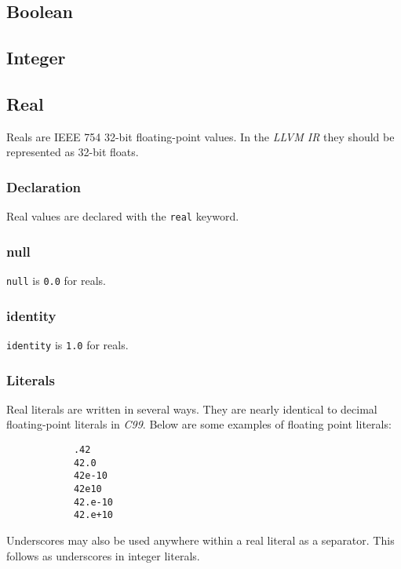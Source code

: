 \documentclass[../../gazprea.tex]{subfiles}
\begin{document}
\subsection{Boolean}
\label{ssec:boolean}


\subsection{Integer}
\label{ssec:integer}


	\subsection{Real}\label{sec:real}

		Reals are IEEE 754 32-bit floating-point values. In the \textit{LLVM IR} they should be represented as 32-bit
		floats.

	\subsubsection{Declaration}

		Real values are declared with the \texttt{real} keyword.

	\subsubsection{null}

		\texttt{null} is \texttt{0.0} for reals.

	\subsubsection{identity}

		\texttt{identity} is \texttt{1.0} for reals.

	\subsubsection{Literals}
  \label{sssec:real_lit}

		Real literals are written in several ways. They are nearly identical to decimal floating-point literals in
		\textit{C99}. Below are some examples of floating point literals:

		\begin{lstlisting}
			.42
			42.0
			42e-10
			42e10
			42.e-10
			42.e+10
		\end{lstlisting}

		Underscores may also be used anywhere within a real literal as a separator.  This follows as underscores in
		integer literals.
\end{document}
